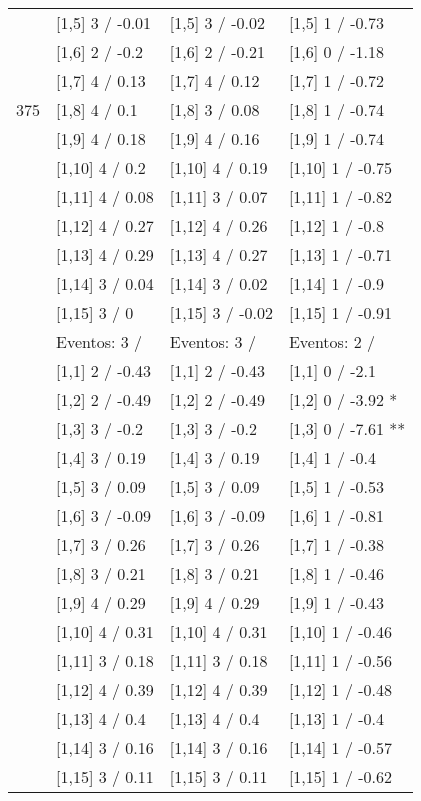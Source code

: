 \begin{table}
\begin{tabular}[t]{llll}
 & {}[1,5] 3  / -0.01 & {}[1,5] 3  / -0.02 & {}[1,5] 1  / -0.73\\
 & {}[1,6] 2  / -0.2 & {}[1,6] 2  / -0.21 & {}[1,6] 0  / -1.18\\
 & {}[1,7] 4  / 0.13 & {}[1,7] 4  / 0.12 & {}[1,7] 1  / -0.72\\
375 & {}[1,8] 4  / 0.1 & {}[1,8] 3  / 0.08 & {}[1,8] 1  / -0.74\\
\addlinespace
 & {}[1,9] 4  / 0.18 & {}[1,9] 4  / 0.16 & {}[1,9] 1  / -0.74\\
 & {}[1,10] 4  / 0.2 & {}[1,10] 4  / 0.19 & {}[1,10] 1  / -0.75\\
 & {}[1,11] 4  / 0.08 & {}[1,11] 3  / 0.07 & {}[1,11] 1  / -0.82\\
 & {}[1,12] 4  / 0.27 & {}[1,12] 4  / 0.26 & {}[1,12] 1  / -0.8\\
 & {}[1,13] 4  / 0.29 & {}[1,13] 4  / 0.27 & {}[1,13] 1  / -0.71\\
\addlinespace
 & {}[1,14] 3  / 0.04 & {}[1,14] 3  / 0.02 & {}[1,14] 1  / -0.9\\
 & {}[1,15] 3  / 0 & {}[1,15] 3  / -0.02 & {}[1,15] 1  / -0.91\\
 & Eventos:  3 / & Eventos:  3 / & Eventos:  2 /\\
 & {}[1,1] 2  / -0.43 & {}[1,1] 2  / -0.43 & {}[1,1] 0  / -2.1\\
 & {}[1,2] 2  / -0.49 & {}[1,2] 2  / -0.49 & {}[1,2] 0  / -3.92 *\\
\addlinespace
 & {}[1,3] 3  / -0.2 & {}[1,3] 3  / -0.2 & {}[1,3] 0  / -7.61 **\\
 & {}[1,4] 3  / 0.19 & {}[1,4] 3  / 0.19 & {}[1,4] 1  / -0.4\\
 & {}[1,5] 3  / 0.09 & {}[1,5] 3  / 0.09 & {}[1,5] 1  / -0.53\\
 & {}[1,6] 3  / -0.09 & {}[1,6] 3  / -0.09 & {}[1,6] 1  / -0.81\\
 & {}[1,7] 3  / 0.26 & {}[1,7] 3  / 0.26 & {}[1,7] 1  / -0.38\\
\addlinespace
500 & {}[1,8] 3  / 0.21 & {}[1,8] 3  / 0.21 & {}[1,8] 1  / -0.46\\
 & {}[1,9] 4  / 0.29 & {}[1,9] 4  / 0.29 & {}[1,9] 1  / -0.43\\
 & {}[1,10] 4  / 0.31 & {}[1,10] 4  / 0.31 & {}[1,10] 1  / -0.46\\
 & {}[1,11] 3  / 0.18 & {}[1,11] 3  / 0.18 & {}[1,11] 1  / -0.56\\
 & {}[1,12] 4  / 0.39 & {}[1,12] 4  / 0.39 & {}[1,12] 1  / -0.48\\
\addlinespace
 & {}[1,13] 4  / 0.4 & {}[1,13] 4  / 0.4 & {}[1,13] 1  / -0.4\\
 & {}[1,14] 3  / 0.16 & {}[1,14] 3  / 0.16 & {}[1,14] 1  / -0.57\\
 & {}[1,15] 3  / 0.11 & {}[1,15] 3  / 0.11 & {}[1,15] 1  / -0.62\\
\bottomrule
\end{tabular}
\end{table}
